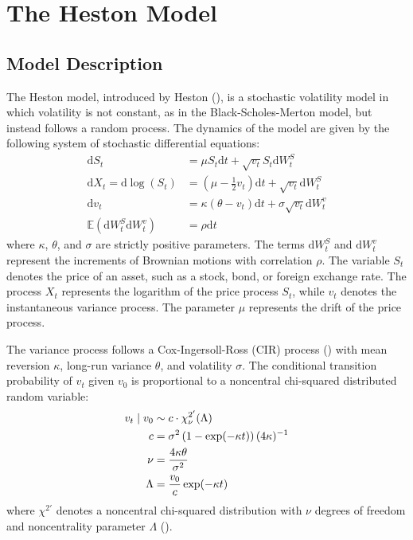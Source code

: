 \chapter{The Heston Model}
\label{sec:heston_model}

\section{Model Description}

The Heston model, introduced by Heston (\citeyear{hestonClosedFormSolutionOptions1993}), is a stochastic volatility model in which volatility is not constant, as in the Black-Scholes-Merton model, but instead follows a random process. The dynamics of the model are given by the following system of stochastic differential equations:
\begin{align}
    \label{eq:heston_model_price}
    \mathrm{d}S_t &= \mu S_t\mathrm{d}t + \sqrt{v_t}S_t\mathrm{d}W_t^S \\
    \label{eq:heston_model_log_price}
    \mathrm{d}X_t = \mathrm{d}\log(S_t) &= \left(\mu-\frac{1}{2}v_t\right)\mathrm{d}t + \sqrt{v_t}\mathrm{d}W_t^S \\
    \label{eq:heston_model_variance}
    \mathrm{d}v_t &= \kappa(\theta-v_t)\mathrm{d}t + \sigma\sqrt{v_t}\mathrm{d}W_t^v \\
    \label{eq:heston_model_correlation}
    \mathbb{E}(\mathrm{d}W_t^S\mathrm{d}W_t^v) &= \rho\mathrm{d}t
\end{align}
where $\kappa$, $\theta$, and $\sigma$ are strictly positive parameters. The terms $\mathrm{d}W_t^S$ and $\mathrm{d}W_t^v$ represent the increments of Brownian motions with correlation $\rho$. The variable $S_t$ denotes the price of an asset, such as a stock, bond, or foreign exchange rate. The process $X_t$ represents the logarithm of the price process $S_t$, while $v_t$ denotes the instantaneous variance process. The parameter $\mu$ represents the drift of the price process.

The variance process follows a Cox-Ingersoll-Ross (CIR) process (\cite{coxTheoryTermStructure1985}) with mean reversion $\kappa$, long-run variance $\theta$, and volatility $\sigma$. The conditional transition probability of $v_t$ given $v_0$ is proportional to a noncentral chi-squared distributed random variable:
\begin{align}
    \label{eq:heston_model_variance_transition}
    v_t\mid v_0 &\sim c\cdot \chi^{2'}_{\nu}(\Lambda) \\
    c &= \sigma^2\left(1 - \exp(-\kappa t)\right)(4\kappa)^{-1} \notag \\
    \nu &= \frac{4\kappa\theta}{\sigma^2} \notag \\
    \Lambda &= \frac{v_0}{c}\exp(-\kappa t) \notag
\end{align}
where $\chi^{2'}$ denotes a noncentral chi-squared distribution with $\nu$ degrees of freedom and noncentrality parameter $\Lambda$ (\cite{okhrinSimulatingCoxIngersoll2022}).

